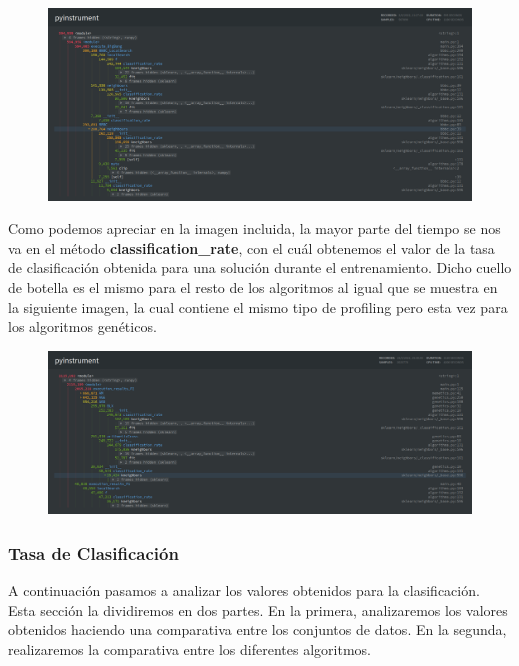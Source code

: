 \documentclass[10pt, a4paper]{article}
\theoremstyle{theorem-style}
\theoremstyle{theorem-style}
\theoremstyle{theorem2-style}
\theoremstyle{definition-style}
\theoremstyle{remark-style}
\theoremstyle{example-style}
\theoremstyle{definition-style}
\theoremstyle{remark-style}
\theoremstyle{remark-style}
\begin{document}
\newpage
\begin{figure}[htp]
\centering
\includegraphics[scale=0.25]{Imagenes/pyinstrument.png}
\label{}
\end{figure}

Como podemos apreciar en la imagen incluida, la mayor parte del tiempo se nos va en el método \textbf{classification\_rate}, con el cuál obtenemos el valor de la tasa de clasificación obtenida para una solución durante el entrenamiento. Dicho cuello de botella es el mismo para el resto de los algoritmos al igual que se muestra en la siguiente imagen, la cual contiene el mismo tipo de profiling pero esta vez para los algoritmos genéticos. 

\begin{figure}[htp]
\centering
\includegraphics[scale=0.25]{Imagenes/cuello_botella.png}
\label{}
\end{figure}

\subsubsection{Tasa de Clasificación}

A continuación pasamos a analizar los valores obtenidos para la clasificación. Esta sección la dividiremos en dos partes. En la primera, analizaremos los valores obtenidos haciendo una comparativa entre los conjuntos de datos. En la segunda, realizaremos la comparativa entre los diferentes algoritmos. 
\end{document}
